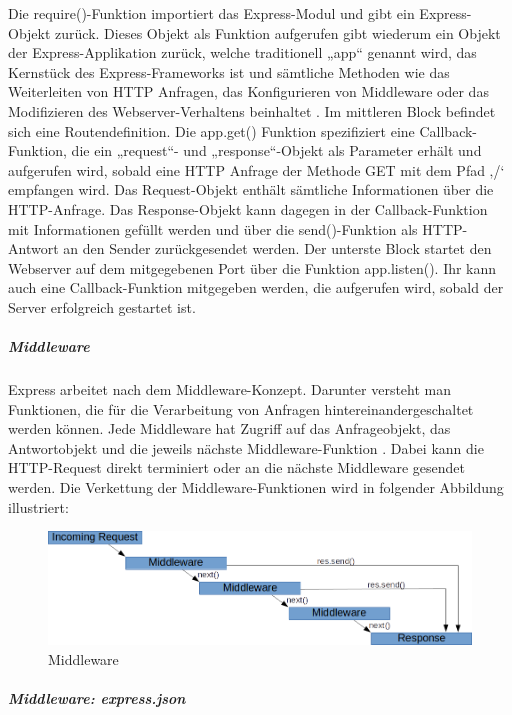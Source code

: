 \noindent
Die require()-Funktion importiert das Express-Modul und gibt ein Express-Objekt zurück. 
Dieses Objekt als Funktion aufgerufen gibt wiederum ein Objekt der Express-Applikation zurück, welche traditionell „app“ genannt wird, das Kernstück des Express-Frameworks ist und sämtliche Methoden wie das Weiterleiten von HTTP Anfragen, das Konfigurieren von Middleware oder das Modifizieren des Webserver-Verhaltens beinhaltet \cite{Node1.8}.
\newline
\noindent
Im mittleren Block befindet sich eine Routendefinition. Die app.get() Funktion spezifiziert eine Callback-Funktion, die ein „request“- und „response“-Objekt als Parameter erhält und aufgerufen wird, sobald eine HTTP Anfrage der Methode GET mit dem Pfad ‚/‘ empfangen wird. Das Request-Objekt enthält sämtliche Informationen über die HTTP-Anfrage. Das Response-Objekt kann dagegen in der Callback-Funktion mit Informationen gefüllt werden und über die send()-Funktion als HTTP-Antwort an den Sender zurückgesendet werden.
\newline
\noindent
Der unterste Block startet den Webserver auf dem mitgegebenen Port über die Funktion app.listen(). Ihr kann auch eine Callback-Funktion mitgegeben werden, die aufgerufen wird, sobald der Server erfolgreich gestartet ist.
\newpage
\noindent
\subparagraph{Middleware}
Express arbeitet nach dem Middleware-Konzept. Darunter versteht man Funktionen, die für die Verarbeitung von Anfragen hintereinandergeschaltet werden können. Jede Middleware hat Zugriff auf das Anfrageobjekt, das Antwortobjekt und die jeweils nächste Middleware-Funktion \cite{Node1.9}.
Dabei kann die HTTP-Request direkt terminiert oder an die nächste Middleware gesendet werden. Die Verkettung der Middleware-Funktionen wird in folgender Abbildung illustriert:
\newline

\begin{figure}[h]
\centering
\includegraphics[width=12cm]{images/nodejs_middleware.png}
\caption{Middleware \cite{Node1.2}}
\end{figure}

%
%

\noindent
\subparagraph{Middleware: express.json}

